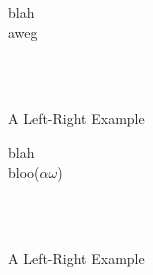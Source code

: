 \documentclass[class=article, crop=false]{standalone}
\begin{document}
\begin{landscape}
  \begin{figure}[th]
    \caption{A Left-Right Example}
    \begin{center}
    \begin{eventchain}[dir=right, dist=0.2cm]
      \state[5]
      \state
      \state
      \state
      \state
      \begin{event}[name=Event, dist=0.7cm]
        blah \\
        aweg \\
      \end{event}
      \state
      \begin{fluents}[name=State, dist=0.7cm, cols=2, fmt={c | l}]
         \\
         \\
      \end{fluents}
      \state
      \state
      \state
      \jumpto[100]
    \end{eventchain}
    \end{center}
  \end{figure}

  \hrulefill

  \begin{figure}[bh]
    \begin{center}
    \begin{eventchain}[dir=right, dist=0.2cm]
      \state[5]
      \state
      \state
      \jumpto[10]
      \state
      \state
      \begin{event}[name=Event, dist=0.7cm]
        blah \\
        bloo($ \alpha \omega $) \\
      \end{event}
      \state
      \begin{fluents}[name=State, dist=0.7cm, cols=2, fmt={c | l}]
         \\
         \\
      \end{fluents}
      \state
      \state
      \state
      \jumpto[100]
    \end{eventchain}
    \end{center}
    \caption{A Left-Right Example}
  \end{figure}
\end{landscape}
\restoregeometry



\end{document}
